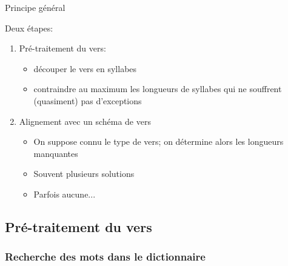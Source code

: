 \documentclass{beamer}
\begin{document}
\begin{frame}{Principe général}

Deux étapes:

\begin{enumerate}
\item Pré-traitement du vers:
\begin{itemize}
\item découper le vers en syllabes
\item contraindre au maximum les longueurs de syllabes qui ne souffrent (quasiment) pas d'exceptions
\end{itemize}

\item Alignement avec un schéma de vers

\begin{itemize}
\item On suppose connu le type de vers; on détermine alors les longueurs manquantes
\item Souvent plusieurs solutions
\item Parfois aucune...
\end{itemize}

\end{enumerate}
\end{frame} %



\subsection{Pré-traitement du vers}

\subsubsection{Recherche des mots dans le dictionnaire}
\end{document}
